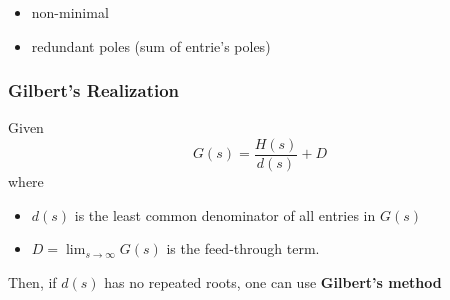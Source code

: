 
\begin{itemize}
    \item non-minimal
    \item redundant poles (sum of entrie's poles)
\end{itemize}

\subsubsection{Gilbert's Realization}

Given
\begin{equation*}
    G(s)=\frac{H(s)}{d(s)}+D
\end{equation*}
where
\begin{itemize}
    \item $d(s)$ is the least common denominator of all entries in $G(s)$
    \item $D=\lim_{s\to\infty}G(s)$ is the feed-through term.
\end{itemize}

Then, if $d(s)$ has no repeated roots, one can use \textbf{Gilbert's method}

